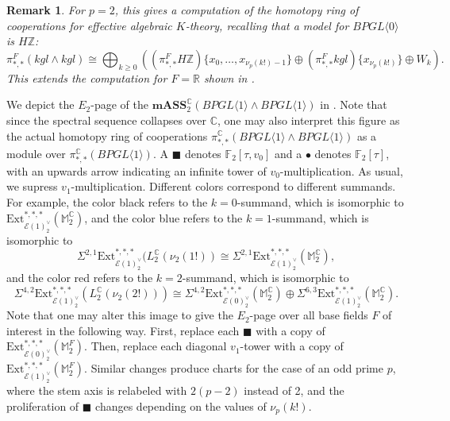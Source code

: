 \documentclass{amsart}
\newtheorem{remark}[theorem]{Remark}
\theoremstyle{plain}
\numberwithin{theorem}{section}
\numberwithin{equation}{section}
\numberwithin{figure}{section}
\newcommand{\0}{\langle 0 \rangle }
\begin{document}
\begin{remark}
    \rm For $p=2$, this gives a computation of the homotopy ring of cooperations for effective algebraic $K$-theory, recalling that a model for $BPGL\langle 0 \rangle$ is $H\mathbb{Z}$:
    \[\pi^F_{*,*}(kgl \wedge kgl) \cong \bigoplus_{k \geq 0}\left((\pi_{*,*}^FH\mathbb{Z})\{x_0, \dots, x_{\nu_p(k!)-1}\} \oplus (\pi^F_{*,*}kgl)\{x_{\nu_p(k!)}\} \oplus W_k\right).\]
    This extends the computation for $F=\mathbb{R}$ shown in \cite{LiPetTat25}.
\end{remark}

We depict the $E_2$-page of the $\textbf{mASS}^{\mathbb{C}}_2(BPGL \langle 1 \rangle\wedge BPGL \langle 1 \rangle)$ in . Note that since the spectral sequence collapses over $\mathbb{C}$, one may also interpret this figure as the actual homotopy ring of cooperations $\pi_{*,*}^{\mathbb{C}}(BPGL\langle 1 \rangle \wedge BPGL \langle 1 \rangle)$ as a module over $\pi_{*,*}^{\mathbb{C}}(BPGL \langle 1 \rangle)$. A $\blacksquare$ denotes $\mathbb{F}_2[\tau, v_0]$ and a $\bullet$ denotes $\mathbb{F}_2[\tau]$, with an upwards arrow indicating an infinite tower of $v_0$-multiplication. As usual, we supress $v_1$-multiplication. Different colors correspond to different summands. For example, the color black refers to the $k=0$-summand, which is isomorphic to $\text{Ext}_{\mathcal{E}(1)^\vee_2}^{*,*,*}(\mathbb{M}_2^{\mathbb{C}})$, and the color blue refers to the $k=1$-summand, which is isomorphic to 
\[\Sigma^{2,1}\text{Ext}_{\mathcal{E}(1)_2^\vee}^{*,*,*}(L_2^\mathbb{C}(\nu_2(1!)) \cong \Sigma^{2,1}\text{Ext}_{\mathcal{E}(1)^\vee_2}^{*,*,*}(\mathbb{M}_2^{\mathbb{C}}),\]
and the color red refers to the $k=2$-summand, which is isomorphic to
\[\Sigma^{4,2}\text{Ext}_{\mathcal{E}(1)^\vee_2}^{*,*,*}(L_2^\mathbb{C}(\nu_2(2!))) \cong \Sigma^{4,2}\text{Ext}_{\mathcal{E}(0)^\vee_2}^{*,*,*}(\mathbb{M}_2^{\mathbb{C}}) \oplus \Sigma^{6,3}\text{Ext}_{\mathcal{E}(1)_2^\vee}^{*,*,*}(\mathbb{M}_2^{\mathbb{C}}).\]
Note that one may alter this image to give the $E_2$-page over all base fields $F$ of interest in the following way. First, replace each $\blacksquare$ with a copy of $\text{Ext}_{\mathcal{E}(0)^\vee_2}^{*,*,*}(\mathbb{M}_2^F)$. Then, replace each diagonal $v_1$-tower with a copy of $\text{Ext}_{\mathcal{E}(1)^\vee_2}^{*,*,*}(\mathbb{M}_2^F)$. Similar changes produce charts for the case of an odd prime $p$, where the stem axis is relabeled with $2(p-2)$ instead of 2, and the proliferation of $\blacksquare$ changes depending on the values of $\nu_p(k!)$.
\end{document}
